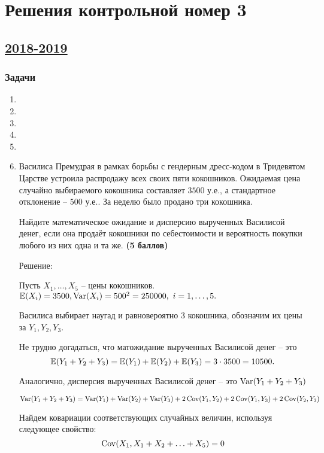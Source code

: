 \thispagestyle{empty}
\section{Решения контрольной номер 3}

\subsection[2018-2019]{\hyperref[sec:kr_03_2018_2019]{2018-2019}}
\label{sec:sol_kr_03_2018_2019}
\subsubsection*{Задачи}
\begin{enumerate}[resume]
	
  \item
  \item
  \item
  \item
  \item
	\item Василиса Премудрая в рамках борьбы с гендерным дресс-кодом в Тридевятом Царстве устроила распродажу всех своих пяти
   кокошников. Ожидаемая цена случайно выбираемого кокошника составляет $3500$ у.е., а стандартное отклонение – $500$ у.е.. 
   За неделю было продано три кокошника.
	
	Найдите математическое ожидание и дисперсию вырученных Василисой денег, 
  если она продаёт кокошники по себестоимости и вероятность покупки любого из них одна и та же. \textbf{(5 баллов)}

	 Решение: 

	Пусть $X_1, \ldots, X_5$ -- цены кокошников. $\operatorname{\mathbb{E}} (X_i) = 3500, \operatorname{Var} (X_i) = 500^2 = 250000, \ i = 1, \ldots , 5.$ 

 Василиса выбирает наугад и равновероятно 3 кокошника, обозначим их цены за $Y_1, Y_2, Y_3$. 

Не трудно догадаться, что матожидание вырученных Василисой денег -- это  \[ \operatorname{\mathbb{E}} (Y_1 + Y_2 + Y_3) = 
\operatorname{\mathbb{E}} (Y_1)  + \operatorname{\mathbb{E}} (Y_2) + \operatorname{\mathbb{E}} (Y_3) = 3 \cdot 3500 = 10500.\] 

 Аналогично, дисперсия вырученных Василисой денег -- это $\operatorname{Var} (Y_1 + Y_2 + Y_3)$ 

\[ \operatorname{Var} (Y_1 + Y_2 + Y_3) = \operatorname{Var} (Y_1) + \operatorname{Var} (Y_2) + \operatorname{Var} (Y_3) + 2 \operatorname{Cov} (Y_1, Y_2) + 2 \operatorname{Cov} (Y_1, Y_3) + 2 \operatorname{Cov} (Y_2, Y_3)\]

 Найдем ковариации соответствующих случайных величин, используя следующее свойство: 
 \[ \operatorname{Cov} (X_1, X_1 + X_2 + \ldots + X_5) = 0\]


\end{enumerate}
